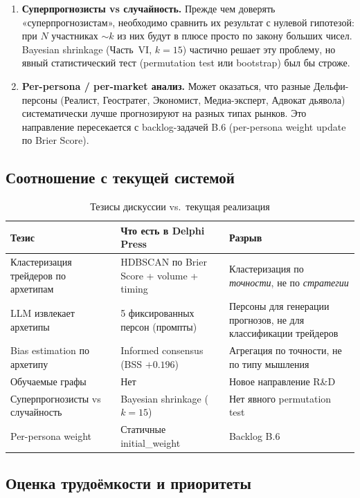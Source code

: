 \documentclass[a4paper, 11pt]{article}
\begin{document}
\begin{enumerate}
  \item \textbf{Суперпрогнозисты vs случайность.}
    Прежде чем доверять «суперпрогнозистам»,
    необходимо сравнить их результат с нулевой гипотезой:
    при $N$ участниках ${\sim}k$ из них будут в плюсе
    просто по закону больших чисел.
    Bayesian shrinkage (Часть~VI, $k=15$) частично решает эту проблему,
    но явный статистический тест (permutation test или bootstrap)
    был бы строже.

  \item \textbf{Per-persona / per-market анализ.}
    Может оказаться, что разные Дельфи-персоны
    (Реалист, Геостратег, Экономист, Медиа-эксперт, Адвокат дьявола)
    систематически лучше прогнозируют на разных типах рынков.
    Это направление пересекается с backlog-задачей B.6
    (per-persona weight update по Brier Score).
\end{enumerate}

\subsection{Соотношение с текущей системой}

\begin{table}[ht]
\centering
\small
\begin{tabular}{p{5cm}p{5cm}p{4.5cm}}
\toprule
\textbf{Тезис} & \textbf{Что есть в Delphi Press} & \textbf{Разрыв} \\
\midrule
Кластеризация трейдеров по архетипам &
  HDBSCAN по Brier Score + volume + timing &
  Кластеризация по \emph{точности}, не по \emph{стратегии} \\
LLM извлекает архетипы &
  5 фиксированных персон (промпты) &
  Персоны для генерации прогнозов, не для классификации трейдеров \\
Bias estimation по архетипу &
  Informed consensus (BSS $+0.196$) &
  Агрегация по точности, не по типу мышления \\
Обучаемые графы &
  Нет &
  Новое направление R\&D \\
Суперпрогнозисты vs случайность &
  Bayesian shrinkage ($k=15$) &
  Нет явного permutation test \\
Per-persona weight &
  Статичные initial\_weight &
  Backlog B.6 \\
\bottomrule
\end{tabular}
\caption{Тезисы дискуссии vs.\ текущая реализация}
\label{tab:discussion_gap}
\end{table}

\subsection{Оценка трудоёмкости и приоритеты}
\end{document}
